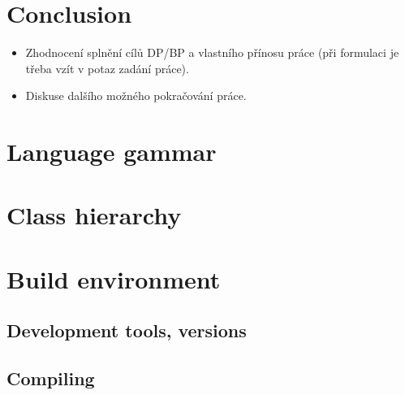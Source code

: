 \documentclass[11pt,twoside,a4paper]{book}
\begin{document}

\chapter{Conclusion}

\begin{itemize}
\item Zhodnocení splnění cílů DP/BP a  vlastního přínosu práce (při formulaci je třeba vzít v potaz zadání práce).
\item Diskuse dalšího možného pokračování práce.
\end{itemize}



%
%
%



\appendix


\chapter{Language gammar}



\chapter{Class hierarchy}



\chapter{Build environment}

\section{Development tools, versions}
\section{Compiling}
\end{document}
